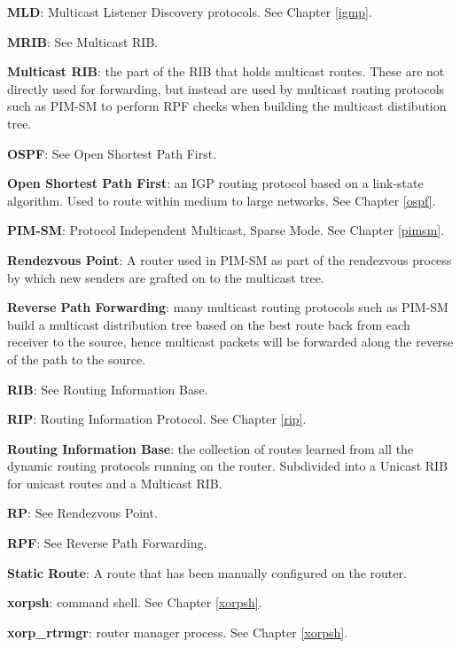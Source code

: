 \begin{description}
  \item{\bf MLD}: Multicast Listener Discovery protocols.  See Chapter
  \ref{igmp}.

  \item{\bf MRIB}: See Multicast RIB.

  \item{\bf Multicast RIB}: the part of the RIB that holds multicast routes.
  These are not directly used for forwarding, but instead are used by
  multicast routing protocols such as PIM-SM to perform RPF checks
  when building the multicast distibution tree.

  \item{\bf OSPF}: See Open Shortest Path First.

  \item{\bf Open Shortest Path First}: an IGP routing protocol based on
  a link-state algorithm.  Used to route within medium to large
  networks. See Chapter \ref{ospf}.

  \item{\bf PIM-SM}: Protocol Independent Multicast, Sparse Mode. See
  Chapter \ref{pimsm}.

  \item{\bf Rendezvous Point}: A router used in PIM-SM as part of the
  rendezvous process by which new senders are grafted on to the
  multicast tree.

  \item{\bf Reverse Path Forwarding}: many multicast routing protocols
  such as PIM-SM build a multicast distribution tree based on the best
  route back from each receiver to the source, hence multicast packets
  will be forwarded along the reverse of the path to the source.

  \item{\bf RIB}: See Routing Information Base.

  \item{\bf RIP}: Routing Information Protocol.  See Chapter \ref{rip}.

  \item{\bf Routing Information Base}: the collection of routes learned
  from all the dynamic routing protocols running on the router.
  Subdivided into a Unicast RIB for unicast routes and a Multicast RIB.

  \item{\bf RP}: See Rendezvous Point.

  \item{\bf RPF}: See Reverse Path Forwarding.

  \item{\bf Static Route}: A route that has been manually configured on
  the router.

  \item{\bf xorpsh}: \xorp command shell.  See Chapter \ref{xorpsh}.

  \item{\bf xorp\_rtrmgr}: \xorp router manager process.  See Chapter
  \ref{xorpsh}.

\end{description}
